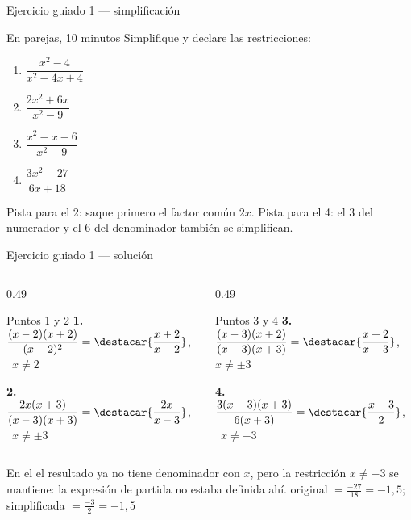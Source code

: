 \documentclass[aspectratio=169,10pt]{beamer}
\begin{document}
\begin{frame}{Ejercicio guiado 1 — simplificación}
  \begin{alertblock}{En parejas, 10 minutos}
    \scriptsize
    Simplifique y declare las restricciones:
    \begin{enumerate}\setlength{\itemsep}{-0.02cm}
      \item $\dfrac{x^{2}-4}{x^{2}-4x+4}$
      \item $\dfrac{2x^{2}+6x}{x^{2}-9}$
      \item $\dfrac{x^{2}-x-6}{x^{2}-9}$
      \item $\dfrac{3x^{2}-27}{6x+18}$
    \end{enumerate}
  \end{alertblock}

  \vspace{0.04cm}
  {\tiny\color{uniGris} Pista para el 2: saque primero el factor común
  $2x$. Pista para el 4: el $3$ del numerador y el $6$ del denominador también
  se simplifican.}
\end{frame}

\begin{frame}{Ejercicio guiado 1 — solución}
  \scriptsize
  \begin{columns}[T,onlytextwidth]
    \begin{column}{0.49\textwidth}
      \begin{block}{Puntos 1 y 2}
        \tiny
        \textbf{1.} $\dfrac{(x-2)(x+2)}{(x-2)^{2}}
        = \destacar{\dfrac{x+2}{x-2}}$, \ $x\neq 2$

        \vspace{0.12cm}
        \textbf{2.} $\dfrac{2x(x+3)}{(x-3)(x+3)}
        = \destacar{\dfrac{2x}{x-3}}$, \ $x\neq \pm 3$
      \end{block}
    \end{column}
    \begin{column}{0.49\textwidth}
      \begin{block}{Puntos 3 y 4}
        \tiny
        \textbf{3.} $\dfrac{(x-3)(x+2)}{(x-3)(x+3)}
        = \destacar{\dfrac{x+2}{x+3}}$, \ $x\neq \pm 3$

        \vspace{0.12cm}
        \textbf{4.} $\dfrac{3(x-3)(x+3)}{6(x+3)}
        = \destacar{\dfrac{x-3}{2}}$, \ $x\neq -3$
      \end{block}
    \end{column}
  \end{columns}

  \vspace{0.1cm}
  {\tiny\color{uniGris} En el  el resultado ya no tiene
  denominador con $x$, pero la restricción $x\neq -3$ se mantiene: la
  expresión de partida no estaba definida ahí.  original $=\frac{-27}{18}=-1{,}5$; simplificada
  $=\frac{-3}{2}=-1{,}5$ \checkmark}
\end{frame}
\end{document}

